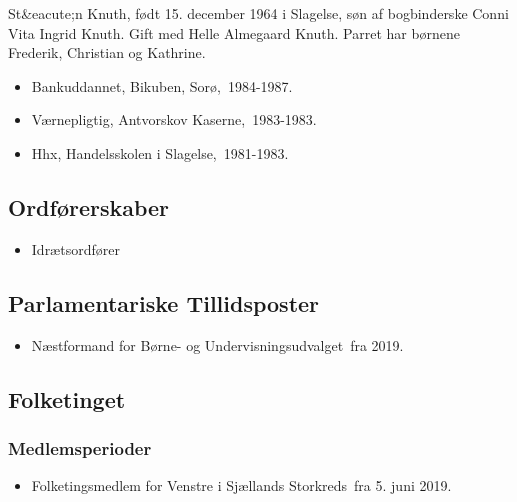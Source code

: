 \documentclass[11pt, a4paper]{awesome-cv}
\begin{document}
\makecvheader[R]
\makelettertitle
\begin{cvletter}
St&eacute;n Knuth, født 15. december 1964 i Slagelse, søn af bogbinderske Conni Vita Ingrid Knuth. Gift med Helle Almegaard Knuth. Parret har børnene Frederik, Christian og Kathrine. 

\begin{itemize}
\item Bankuddannet, Bikuben, Sorø, 1984-1987.
\item Værnepligtig, Antvorskov Kaserne, 1983-1983.
\item Hhx, Handelsskolen i Slagelse, 1981-1983.
\end{itemize}
\subsection*{Ordførerskaber}
\begin{itemize}
\item Idrætsordfører
\end{itemize}
\subsection*{Parlamentariske Tillidsposter}
\begin{itemize}
\item Næstformand for Børne- og Undervisningsudvalget fra 2019.
\end{itemize}
\subsection*{Folketinget}
\subsubsection*{Medlemsperioder}
\begin{itemize}
\item Folketingsmedlem for Venstre i Sjællands Storkreds fra 5. juni 2019.
\end{itemize}

\end{cvletter}
\end{document}
